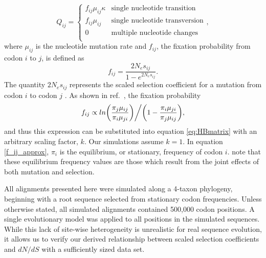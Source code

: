 \documentclass{pnastwo}
\begin{document}
\begin{article}
\begin{equation}\label{eq:HBmatrix}
	Q_{ij} = \left\{ 
	\begin{array}{rl}
		f_{ij}\mu_{ij}\kappa               &\mbox{single nucleotide transition} \\
		f_{ij}\mu_{ij}                          &\mbox{single nucleotide transversion} \\
		0                                           &\mbox{multiple nucleotide changes} \\             
	\end{array} \right.,
\end{equation} where $\mu_{ij}$ is the nucleotide mutation rate and $f_{ij}$, the fixation probability from codon $i$ to $j$, is defined as 
\begin{equation}\label{f_ij_approx} f_{ij} = \frac{2N_es_{ij}}{1 - e^{2N_es_{ij}}}. \end{equation} The quantity $2N_es_{ij}$ represents the scaled selection coefficient for a mutation from codon $i$ to codon $j$ \cite{HalpernBruno1998, YangNielsen2008}. As shown in ref.\ \cite{HalpernBruno1998}, the fixation probability \begin{equation}f_{ij} \propto ln\bigg{(}\frac{\pi_j\mu_{ij}}{\pi_i\mu_{ji}}\bigg{)}\bigg{/}\bigg{(}1 - \frac{\pi_i\mu_{ji}}{\pi_j\mu_{ij}}\bigg{)},\end{equation} and thus this expression can be substituted into equation \eqref{eq:HBmatrix} with an arbitrary scaling factor, $k$. Our simulations assume $k=1$. In equation \eqref{f_ij_approx}, $\pi_i$ is the equilibrium, or stationary, frequency of codon $i$. note that these equilibrium frequency values are those which result from the joint effects of both mutation and selection. 


All alignments presented here were simulated along a 4-taxon phylogeny, beginning with a root sequence selected from stationary codon frequencies. Unless otherwise stated, all simulated alignments contained 500,000 codon positions. A single evolutionary model was applied to all positions in the simulated sequences. While this lack of site-wise heterogeneity is unrealistic for real sequence evolution, it allows us to verify our derived relationship between scaled selection coefficients and $dN/dS$ with a sufficiently sized data set.



\end{article}
\end{document}
